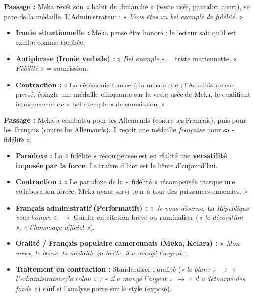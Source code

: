 \documentclass[11pt]{article}
\begin{document}
\begin{exemplebox}
\textbf{Passage :} Meka revêt son « habit du dimanche » (veste usée, pantalon court), se pare de la médaille. L'Administrateur : « \emph{Vous êtes un bel exemple de fidélité.} »
\begin{itemize}
    \item \textbf{Ironie situationnelle :} Meka pense être honoré ; le lecteur sait qu'il est exhibé comme trophée.
    \item \textbf{Antiphrase (Ironie verbale) :} « \emph{Bel exemple} » = triste marionnette. « \emph{Fidélité} » = soumission.
    \item \textbf{Contraction :} « La cérémonie tourne à la mascarade : l'Administrateur, pressé, épingle une médaille clinquante sur la veste usée de Meka, le qualifiant ironiquement de « bel exemple » de soumission. »
\end{itemize}
\end{exemplebox}

\begin{exemplebox}
\textbf{Passage :} Meka a combattu pour les Allemands (contre les Français), puis pour les Français (contre les Allemands). Il reçoit une médaille \emph{française} pour sa « fidélité ».
\begin{itemize}
    \item \textbf{Paradoxe :} La « fidélité » récompensée est en réalité une \textbf{versatilité imposée par la force}. Le traître d'hier est le héros d'aujourd'hui.
    \item \textbf{Contraction :} « Le paradoxe de la « fidélité » récompensée masque une collaboration forcée, Meka ayant servi tour à tour des puissances ennemies. »
\end{itemize}
\end{exemplebox}

\begin{exemplebox}
\begin{itemize}
    \item \textbf{Français administratif (Performatifs) :} « \emph{Je vous décerne}, \emph{La République vous honore} ». $\rightarrow$ Garder en citation brève ou nominaliser (\emph{« la décoration », « l'hommage officiel »}).
    \item \textbf{Oralité / Français populaire camerounais (Meka, Kelara) :} « \emph{Mon vieux}, \emph{le blanc}, \emph{la médaille ça brille}, \emph{il a mangé l'argent} ».
    \item \textbf{Traitement en contraction :} Standardiser l'oralité (\emph{« le blanc » $\rightarrow$ « l'Administrateur/le colon » ; « il a mangé l'argent » $\rightarrow$ « il a détourné des fonds »}) sauf si l'analyse porte sur le style (exposé).
\end{itemize}
\end{exemplebox}
\end{document}
